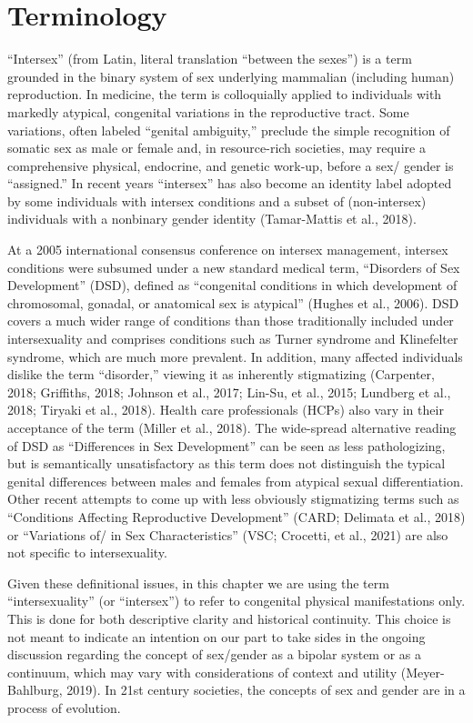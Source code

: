 \documentclass[
]{book}
\begin{document}
\hypertarget{terminology-2}{%
\section*{Terminology}\label{terminology-2}}

``Intersex'' (from Latin, literal translation ``between
the sexes'') is a term grounded in the binary
system of sex underlying mammalian (including
human) reproduction. In medicine, the term is
colloquially applied to individuals with markedly
atypical, congenital variations in the reproductive
tract. Some variations, often labeled ``genital
ambiguity,'' preclude the simple recognition of
somatic sex as male or female and, in resource-rich
societies, may require a comprehensive physical,
endocrine, and genetic work-up, before a sex/
gender is ``assigned.'' In recent years ``intersex''
has also become an identity label adopted by
some individuals with intersex conditions and a
subset of (non-intersex) individuals with a nonbinary gender identity (Tamar-Mattis et al., 2018).

At a 2005 international consensus conference
on intersex management, intersex conditions were
subsumed under a new standard medical term,
``Disorders of Sex Development'' (DSD), defined
as ``congenital conditions in which development
of chromosomal, gonadal, or anatomical sex is
atypical'' (Hughes et al., 2006). DSD covers a
much wider range of conditions than those traditionally included under intersexuality and comprises conditions such as Turner syndrome and
Klinefelter syndrome, which are much more prevalent. In addition, many affected individuals dislike the term ``disorder,'' viewing it as inherently
stigmatizing (Carpenter, 2018; Griffiths, 2018;
Johnson et al., 2017; Lin-Su, et al., 2015; Lundberg
et al., 2018; Tiryaki et al., 2018). Health care professionals (HCPs) also vary in their acceptance
of the term (Miller et al., 2018). The wide-spread
alternative reading of DSD as ``Differences in Sex
Development'' can be seen as less pathologizing,
but is semantically unsatisfactory as this term
does not distinguish the typical genital differences
between males and females from atypical sexual
differentiation. Other recent attempts to come up
with less obviously stigmatizing terms such as
``Conditions Affecting Reproductive Development''
(CARD; Delimata et al., 2018) or ``Variations of/
in Sex Characteristics'' (VSC; Crocetti, et al.,
2021) are also not specific to intersexuality.

Given these definitional issues, in this chapter
we are using the term ``intersexuality'' (or ``intersex'') to refer to congenital physical manifestations only. This is done for both descriptive
clarity and historical continuity. This choice is
not meant to indicate an intention on our part
to take sides in the ongoing discussion regarding
the concept of sex/gender as a bipolar system or
as a continuum, which may vary with considerations of context and utility (Meyer-Bahlburg,
2019). In 21st century societies, the concepts of
sex and gender are in a process of evolution.
\end{document}
